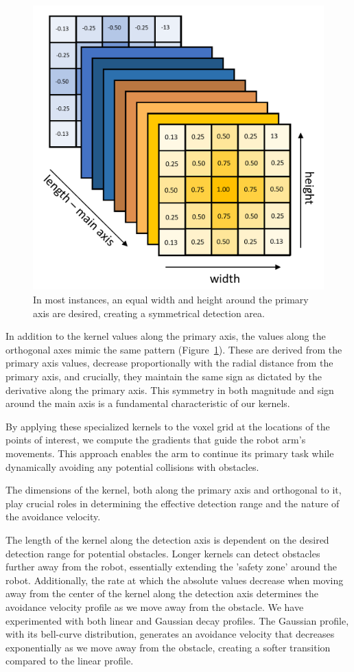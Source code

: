 \documentclass[a4paper]{article}
\begin{document}
\begin{figure}[H]
	\centering
	\includegraphics[width=0.85\linewidth]{kernel-matrix.png}
	\caption{In most instances, an equal width and height around the primary axis are desired, creating a symmetrical detection area.} 
	\label{Kernel matrix}
\end{figure}

In addition to the kernel values along the primary axis, the values along the orthogonal axes mimic the same pattern (Figure~\ref{Kernel matrix}). These are derived from the primary axis values, decrease proportionally with the radial distance from the primary axis, and crucially, they maintain the same sign as dictated by the derivative along the primary axis. This symmetry in both magnitude and sign around the main axis is a fundamental characteristic of our kernels.

By applying these specialized kernels to the voxel grid at the locations of the points of interest, we compute the gradients that guide the robot arm's movements. This approach enables the arm to continue its primary task while dynamically avoiding any potential collisions with obstacles.

The dimensions of the kernel, both along the primary axis and orthogonal to it, play crucial roles in determining the effective detection range and the nature of the avoidance velocity.

The length of the kernel along the detection axis is dependent on the desired detection range for potential obstacles. Longer kernels can detect obstacles further away from the robot, essentially extending the 'safety zone' around the robot. Additionally, the rate at which the absolute values decrease when moving away from the center of the kernel along the detection axis determines the avoidance velocity profile as we move away from the obstacle. We have experimented with both linear and Gaussian decay profiles. The Gaussian profile, with its bell-curve distribution, generates an avoidance velocity that decreases exponentially as we move away from the obstacle, creating a softer transition compared to the linear profile.
\end{document}
